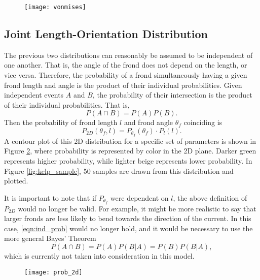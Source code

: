 \begin{figure}[h]
	\centering
	\texttt{[image: vonmises]}
	\label{fig:vonmises}
\end{figure}

\subsection{Joint Length-Orientation Distribution}
\label{sec:dist_2d}
The previous two distributions can reasonably be assumed to be independent of one another. That is, the angle of the frond does not depend on the length, or vice versa.
Therefore, the probability of a frond simultaneously having a given frond length and angle is the product of their individual probabilities.
Given independent events $A$ and $B$, the probability of their intersection is the product of their individual probabilities.
That is,
\begin{equation*}
	\label{eqn:ind_prob}
	P(A \cap B) = P(A)P(B).
\end{equation*}
Then the probability of frond length $l$ and frond angle $\theta_f$ coinciding is
\begin{equation}
  \label{eqn:p2d}
	P_{2D}(\theta_f,l) = P_{\theta_f}(\theta_f) \cdot P_l(l).
\end{equation}
A contour plot of this 2D distribution for a specific set of parameters is shown in Figure \ref{fig:dist_2d}, where probability is represented by color in the 2D plane.
Darker green represents higher probability, while lighter beige represents lower probability.
In Figure \ref{fig:kelp_sample}, 50 samples are drawn from this distribution and plotted.

It is important to note that if $P_{\theta_f}$ were dependent on $l$, the above definition of $P_{2D}$ would no longer be valid.
For example, it might be more realistic to say that larger fronds are less likely to bend towards the direction of the current.
In this case, \eqref{eqn:ind_prob} would no longer hold, and it would be necessary to use the more general Bayes' Theorem
\begin{equation*}
	P(A \cap B) = P(A)P(B|A) = P(B)P(B|A),
\end{equation*}
which is currently not taken into consideration in this model.

\begin{figure}[h]
	\centering
	\texttt{[image: prob\_2d]}
	\label{fig:dist_2d}
\end{figure}

